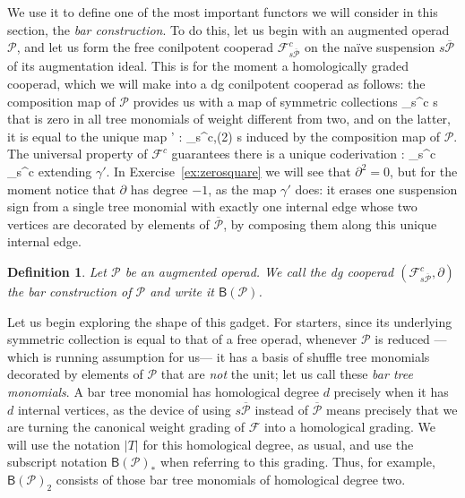 \documentclass[fleqn, a4paper, twoside]{article}
\makeatletter
\newcommand{\0}{\langle 0\rangle}
\newcommand{\FF}{\mathcal{F}}
\newcommand{\B}[1]{\mathsf{B}(#1)}
\let\[\@undefined
\DeclareRobustCommand{\[}{\begin{equation}}%
\let\]\@undefined
\DeclareRobustCommand{\]}{\end{equation}}%
\theoremstyle{mytheorem}
\theoremstyle{introthm}
\theoremstyle{mydefinition}
\newtheorem{definition}[theorem]{Definition}
\theoremstyle{mydefinition2}
\theoremstyle{plain} %
\newcommand{\?}{\,?\,}
\newcommand{\PP}{{\mathcal{P}}}
\theoremstyle{mytheorem}
\theoremstyle{plain} %
\makeatother
\begin{document}
We use it to define one of the most important functors we will 
consider in this section, the \emph{bar construction}. To do this,
let us begin with an augmented operad $\PP$, and let us form
the free conilpotent cooperad $\FF_{s\overline{\PP}}^c$ on the
na\"ive suspension $s\overline{\PP}$ of its augmentation ideal.
This is for the moment a homologically graded cooperad, which we will
make into a dg conilpotent cooperad as follows: the composition
map of $\PP$ provides us with a map of symmetric collections
\[
\FF_{s\overline{\PP}}^c \longrightarrow s\overline\PP
\]
that is zero in all tree monomials of weight different from two, and
on the latter, it is equal to the unique map
\[
\gamma' :  \FF_{s\overline{\PP}}^{c,(2)} 
 \longrightarrow s\overline{\PP}
\]
induced by the composition map of $\PP$. The universal property of $\FF^c$
guarantees there is a unique coderivation 
\[ \partial : \FF_{s\overline{\PP}}^c 
	\longrightarrow \FF_{s\overline{\PP}}^c\]
extending $\gamma'$. In Exercise~\ref{ex:zerosquare} we will see that
$\partial^2 = 0$, but for the moment notice that $\partial$ has degree $-1$,
as the map $\gamma'$ does: it erases one suspension sign from 
a single tree monomial with exactly one internal edge whose
two vertices are decorated by elements of $\overline{\PP}$,
by composing them along this unique internal edge.

\begin{figure}

\end{figure}

\begin{definition}
Let $\PP$ be an augmented operad. 
We call the dg cooperad $(\FF_{s\overline{\PP}}^c ,\partial)$
the bar construction of $\PP$ and write it $\B{\PP}$.
\end{definition}

Let us begin exploring the shape of this gadget. For starters,
since its underlying symmetric collection is equal to that of
a free operad, whenever $\PP$ is reduced ---which is running
assumption for us--- it has a basis of shuffle tree monomials
decorated by elements of $\PP$ that are \emph{not} the unit;
let us call these \emph{bar tree monomials}. A bar tree monomial
has homological degree $d$ precisely when it has $d$ internal
vertices, as the device of using $s\overline{\PP}$ instead of
$\overline\PP$ means precisely that we are turning the canonical
weight grading of $\FF$ into a homological grading. We will
use the notation $|T|$ for this homological degree, as usual,
and use the subscript notation $\B{\PP}_*$ when referring to
this grading. Thus, for example,  $\B{\PP}_2$ consists of
those bar tree monomials of homological degree two.
\end{document}
